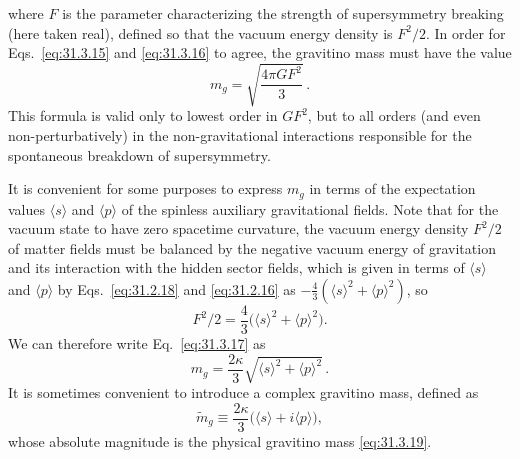where \(F\) is the parameter characterizing the strength of supersymmetry
breaking (here taken real), defined so that the vacuum energy density is
\(F^2/2\). In order for Eqs.~\eqref{eq:31.3.15} and
\eqref{eq:31.3.16} to agree, the gravitino mass must have the value
\begin{equation}
  m_g=\sqrt{\frac{4\pi G F^2}{3}}\,.
  \tag{31.3.17}\label{eq:31.3.17}
\end{equation}
This formula is valid only to lowest order in \(GF^2\), but to all orders
(and even non-perturbatively) in the non-gravitational interactions
responsible for the spontaneous breakdown of supersymmetry.

It is convenient for some purposes to express \(m_g\) in terms of the
expectation values \(\langle s\rangle\) and \(\langle p\rangle\) of the
spinless auxiliary gravitational fields. Note that for the vacuum state
to have zero spacetime curvature, the vacuum energy density \(F^2/2\) of
matter fields must be balanced by the negative vacuum energy of
gravitation and its interaction with the hidden sector fields, which is
given in terms of \(\langle s\rangle\) and \(\langle p\rangle\) by
Eqs.~\eqref{eq:31.2.18} and \eqref{eq:31.2.16} as
\(-\frac43(\langle s\rangle^2+\langle p\rangle^2)\), so
\begin{equation}
  F^2/2=\frac43\bigl(\langle s\rangle^2+\langle p\rangle^2\bigr).
  \tag{31.3.18}\label{eq:31.3.18}
\end{equation}
We can therefore write Eq.~\eqref{eq:31.3.17} as
\begin{equation}
  m_g=\frac{2\kappa}{3}
  \sqrt{\langle s\rangle^2+\langle p\rangle^2}\,.
  \tag{31.3.19}\label{eq:31.3.19}
\end{equation}
It is sometimes convenient to introduce a complex gravitino mass, defined
as
\begin{equation}
  \widetilde m_g\equiv
  \frac{2\kappa}{3}\bigl(\langle s\rangle+i\langle p\rangle\bigr),
  \tag{31.3.20}\label{eq:31.3.20}
\end{equation}
whose absolute magnitude is the physical gravitino mass
\eqref{eq:31.3.19}.
